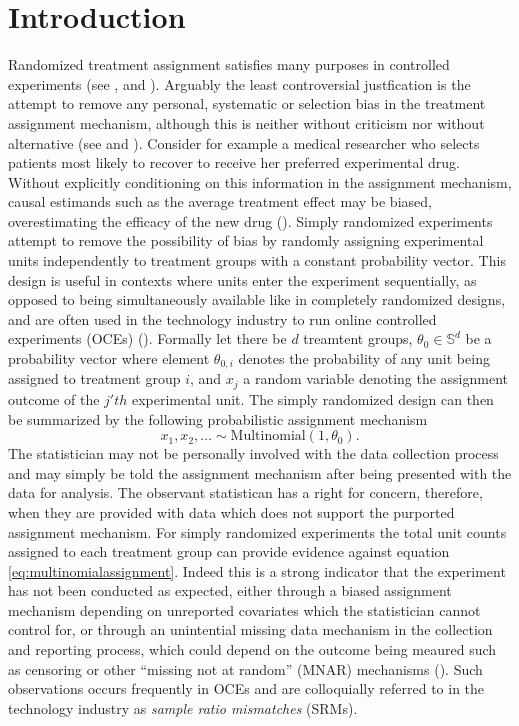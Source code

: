 \documentclass[11pt]{article}
\begin{document}
\section{Introduction}
\label{sec:intro}
Randomized treatment assignment satisfies many purposes in controlled experiments (see \cite{kempthorne}, \cite{cox} and \cite{rubin}).
Arguably the least controversial justfication is the attempt to remove any personal, systematic or selection bias in the treatment assignment mechanism, although this is neither without criticism nor without alternative (see \cite{lindley} and \cite{kadane}).
Consider for example a medical researcher who selects patients most likely to recover to receive her preferred experimental drug.
Without explicitly conditioning on this information in the assignment mechanism, causal estimands such as the average treatment effect may be biased, overestimating the efficacy of the new drug (\cite{berry}).
Simply randomized experiments attempt to remove the possibility of bias by randomly assigning experimental units independently to treatment groups with a constant probability vector.
This design is useful in contexts where units enter the experiment sequentially, as opposed to being simultaneously available like in completely randomized designs, and are often used in the technology industry to run online controlled experiments (OCEs) (\cite{oce}).
Formally let there be $d$ treamtent groups, $\theta_0 \in \mathbb{S}^d$ be a probability vector where element $\theta_{0,i}$ denotes the probability of any unit being assigned to treatment group $i$, and $x_j$ a random variable denoting the assignment outcome of the $j'th$ experimental unit.
The simply randomized design can then be summarized by the following probabilistic assignment mechanism
\begin{equation}
  \label{eq:multinomialassignment}
  x_1,x_2, \dots \sim \text{Multinomial}(1,\theta_0).
\end{equation}
The statistician may not be personally involved with the data collection process and may simply be told the assignment mechanism after being presented with the data for analysis.
The observant statistican has a right for concern, therefore, when they are provided with data which does not support the purported assignment mechanism.
For simply randomized experiments the total unit counts assigned to each treatment group can provide evidence against equation \eqref{eq:multinomialassignment}.
Indeed this is a strong indicator that the experiment has not been conducted as expected, either through a biased assignment mechanism depending on unreported covariates which the statistician cannot control for, or through an unintential missing data mechanism in the collection and reporting process, which could depend on the outcome being meaured such as censoring or other ``missing not at random'' (MNAR) mechanisms (\cite{missing-data}).
Such observations occurs frequently in OCEs and are colloquially referred to in the technology industry as \textit{sample ratio mismatches} (SRMs).
\end{document}
